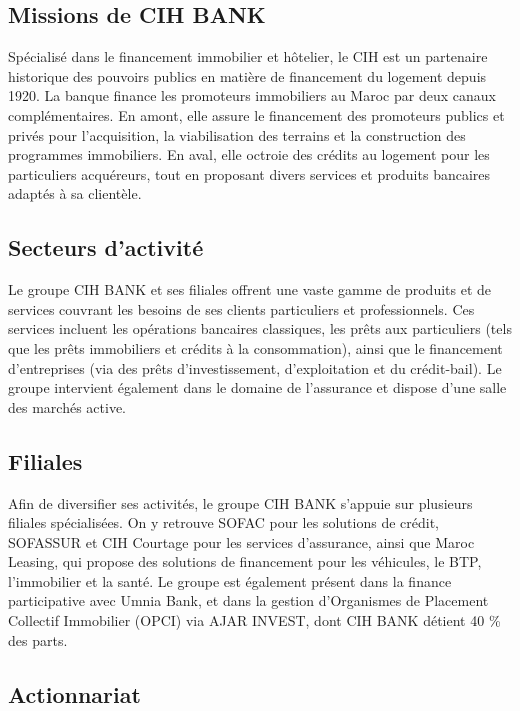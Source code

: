 \subsection{Missions de CIH BANK}

Spécialisé dans le financement immobilier et hôtelier, le CIH est un partenaire historique des pouvoirs publics en matière de financement du logement depuis 1920. La banque finance les promoteurs immobiliers au Maroc par deux canaux complémentaires. En amont, elle assure le financement des promoteurs publics et privés pour l'acquisition, la viabilisation des terrains et la construction des programmes immobiliers. En aval, elle octroie des crédits au logement pour les particuliers acquéreurs, tout en proposant divers services et produits bancaires adaptés à sa clientèle.

\subsection{Secteurs d’activité}

Le groupe CIH BANK et ses filiales offrent une vaste gamme de produits et de services couvrant les besoins de ses clients particuliers et professionnels. Ces services incluent les opérations bancaires classiques, les prêts aux particuliers (tels que les prêts immobiliers et crédits à la consommation), ainsi que le financement d'entreprises (via des prêts d'investissement, d'exploitation et du crédit-bail). Le groupe intervient également dans le domaine de l'assurance et dispose d'une salle des marchés active.

\subsection{Filiales}

Afin de diversifier ses activités, le groupe CIH BANK s'appuie sur plusieurs filiales spécialisées. On y retrouve SOFAC pour les solutions de crédit, SOFASSUR et CIH Courtage pour les services d'assurance, ainsi que Maroc Leasing, qui propose des solutions de financement pour les véhicules, le BTP, l'immobilier et la santé. Le groupe est également présent dans la finance participative avec Umnia Bank, et dans la gestion d'Organismes de Placement Collectif Immobilier (OPCI) via AJAR INVEST, dont CIH BANK détient 40 \% des parts.

\subsection{Actionnariat}

